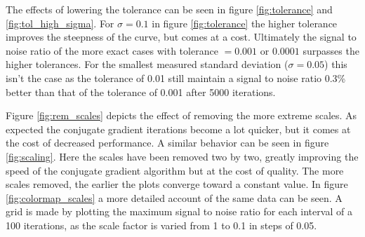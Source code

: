 \documentclass{article}
\begin{document}
The effects of lowering the tolerance can be seen in figure 
\ref{fig:tolerance} and \ref{fig:tol_high_sigma}. For $\sigma = 0.1$ in 
figure \ref{fig:tolerance} the higher tolerance improves the steepness 
of the curve, but comes at a cost. Ultimately the signal to noise ratio 
of the more exact cases with tolerance $= 0.001$ or $0.0001$ surpasses 
the higher tolerances. For the smallest measured standard deviation 
($\sigma = 0.05$) this isn't the case as the tolerance of 0.01 still 
maintain a signal to noise ratio 0.3\% better than that of the tolerance 
of 0.001 after 5000 iterations.


Figure \ref{fig:rem_scales} depicts the effect of removing the more 
extreme scales. As expected the conjugate gradient iterations become a 
lot quicker, but it comes at the cost of decreased performance. A 
similar behavior can be seen in figure \ref{fig:scaling}. Here the 
scales have been removed two by two, greatly improving the speed of the
conjugate gradient algorithm but at the cost of quality. The more scales 
removed, the earlier the plots converge toward a constant value. In 
figure \ref{fig:colormap_scales} a more detailed account of the same 
data can be seen.  A grid is made by plotting the maximum signal to 
noise ratio for each interval of a 100 iterations, as the scale factor 
is varied from 1 to 0.1 in steps of 0.05.
\end{document}
